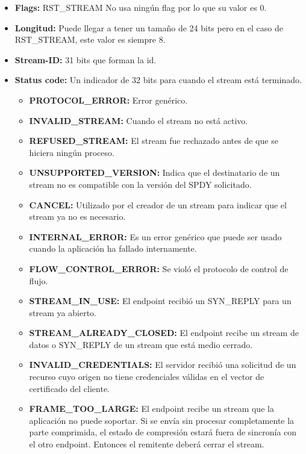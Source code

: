 \begin{itemize}
\item \textbf{Flags:} RST\_STREAM No usa ningún flag por lo que su valor es 0.
\item \textbf{Longitud:} Puede llegar a tener un tamaño de 24 bits pero en el caso de RST\_STREAM, este valor es siempre 8.

\item \textbf{Stream-ID:} 31 bits que forman la id.
\item \textbf{Status code:} Un indicador de 32 bits para cuando el stream está terminado. 
\\
	\begin{itemize}
    \item \textbf{PROTOCOL\_ERROR:} Error genérico.
    \item \textbf{INVALID\_STREAM:} Cuando el stream no está activo.
    \item \textbf{REFUSED\_STREAM:} El stream fue rechazado antes de que se hiciera ningún proceso.
    \item \textbf{UNSUPPORTED\_VERSION:} Indica que el destinatario de un stream no es compatible con la versión del SPDY solicitado.
    \item \textbf{CANCEL:} Utilizado por el creador de un stream para indicar que el stream ya no es necesario.
    \item \textbf{INTERNAL\_ERROR:} Es un error genérico que puede ser usado cuando la aplicación ha fallado internamente.
    \item \textbf{FLOW\_CONTROL\_ERROR:} Se violó el protocolo de control de flujo.
    \item \textbf{STREAM\_IN\_USE:} El endpoint recibió un SYN\_REPLY para un stream ya abierto.
    \item \textbf{STREAM\_ALREADY\_CLOSED:} El endpoint recibe un stream de datos o SYN\_REPLY de un stream que está medio cerrado.
    \item \textbf{INVALID\_CREDENTIALS:} El servidor recibió una solicitud de un recurso cuyo origen no tiene credenciales válidas en el vector de certificado del cliente.
    \item \textbf{FRAME\_TOO\_LARGE:} El endpoint recibe un stream que la aplicación no puede soportar. Si se envía sin procesar completamente la parte comprimida, el estado de compresión estará fuera de sincronía con el otro endpoint. Entonces el remitente deberá cerrar el stream.
\end{itemize}
\end{itemize}


